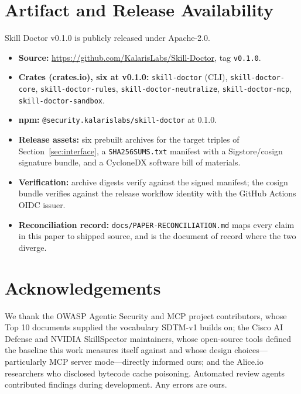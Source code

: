 \documentclass[11pt]{article}
\begin{document}
\section{Artifact and Release Availability}

Skill Doctor v0.1.0 is publicly released under Apache-2.0.

\begin{itemize}[leftmargin=*,itemsep=2pt]
\item \textbf{Source:} \url{https://github.com/KalarisLabs/Skill-Doctor}, tag \texttt{v0.1.0}.
\item \textbf{Crates (crates.io), six at v0.1.0:} \texttt{skill-doctor} (CLI), \texttt{skill-doctor-core}, \texttt{skill-doctor-rules}, \texttt{skill-doctor-neutralize}, \texttt{skill-doctor-mcp}, \texttt{skill-doctor-sandbox}.
\item \textbf{npm:} \texttt{@security.kalarislabs/skill-doctor} at 0.1.0.
\item \textbf{Release assets:} six prebuilt archives for the target triples of Section~\ref{sec:interface}, a \texttt{SHA256SUMS.txt} manifest with a Sigstore/cosign signature bundle, and a CycloneDX software bill of materials.
\item \textbf{Verification:} archive digests verify against the signed manifest; the cosign bundle verifies against the release workflow identity with the GitHub Actions OIDC issuer.
\item \textbf{Reconciliation record:} \texttt{docs/PAPER-RECONCILIATION.md} maps every claim in this paper to shipped source, and is the document of record where the two diverge.
\end{itemize}

\section*{Acknowledgements}

We thank the OWASP Agentic Security and MCP project contributors, whose Top 10 documents supplied the vocabulary SDTM-v1 builds on; the Cisco AI Defense and NVIDIA SkillSpector maintainers, whose open-source tools defined the baseline this work measures itself against and whose design choices---particularly MCP server mode---directly informed ours; and the Alice.io researchers who disclosed bytecode cache poisoning. Automated review agents contributed findings during development. Any errors are ours.
\end{document}
